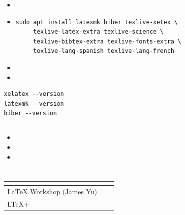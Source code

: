 \gdReqIntro

\begin{itemize}
    \item \gdReqWindows
    \item \gdReqLinux
\begin{lstlisting}[numbers=none, basicstyle=\footnotesize\ttfamily, caption={\gdReqLinuxCaption}, label={lst:linux_packages}]
sudo apt install latexmk biber texlive-xetex \
     texlive-latex-extra texlive-science \
     texlive-bibtex-extra texlive-fonts-extra \
     texlive-lang-spanish texlive-lang-french
\end{lstlisting}
    \gdReqLinuxNote
    \item \gdReqMac
    \item \gdReqMiktex
\end{itemize}

\gdReqCheck

\begin{lstlisting}[numbers=none, caption={\gdReqCheckCaption}, label={lst:check_installation}]
xelatex --version
latexmk --version
biber --version
\end{lstlisting}

\subsection{\gdInstallTitle}
\label{subsec:vscode_install}

\gdInstallIntro

\begin{itemize}
    \item \gdInstallWindows
    \item \gdInstallMac
    \item \gdInstallLinux
\end{itemize}

\subsection{\gdExtTitle}
\label{subsec:vscode_extensions}

\gdExtIntro

\begin{table}[H]
    \centering
    \small
    \begin{tabular}{|p{3.4cm}|p{2.6cm}|p{7.2cm}|}
        \hline
        \textbf{\gdExtHeadExt} & \textbf{\gdExtHeadType} & \textbf{\gdExtHeadFunc} \\ \hline
        LaTeX Workshop (James Yu) & \gdExtRequired    & \gdExtWorkshopDesc \\ \hline
        LTeX+                     & \gdExtRecommended & \gdExtLtexDesc \\ \hline
    \end{tabular}
    \caption{\gdExtCaption}
    \label{tab:vscode_extensions}
\end{table}

